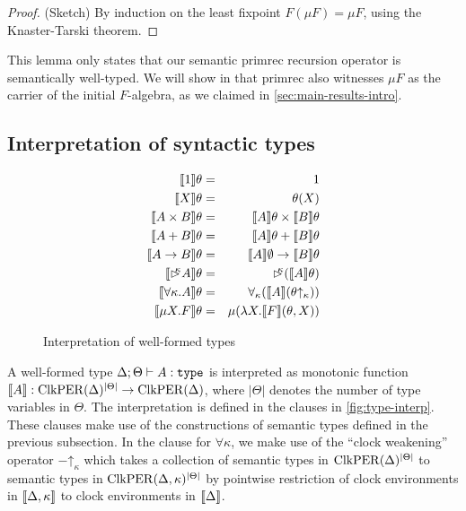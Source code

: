 \begin{proof}
  (Sketch) By induction on the least fixpoint $F(\mu F) = \mu F$,
  using the Knaster-Tarski theorem.
\end{proof}

This lemma only states that our semantic $\mathrm{primrec}$ recursion
operator is semantically well-typed. We will show in
 that $\mathrm{primrec}$ also witnesses
$\mu F$ as the carrier of the initial $F$-algebra, as we claimed in
\autoref{sec:main-results-intro}.

\subsection{Interpretation of syntactic types}\label{sec:type-interp}

\begin{figure}[t]
  \centering
  \begin{eqnarray*}
    \llbracket 1 \rrbracket\theta & = & 1 \\
    \llbracket X \rrbracket\theta & = & \theta(X) \\
    \llbracket A \times B \rrbracket\theta & = & \llbracket A \rrbracket\theta \times \llbracket B \rrbracket\theta \\
    \llbracket A + B \rrbracket\theta & = & \llbracket A \rrbracket\theta + \llbracket B \rrbracket\theta \\
    \llbracket A \to B \rrbracket\theta & = & \llbracket A \rrbracket\emptyset \to \llbracket B \rrbracket\theta \\
    \llbracket \mathord{\rhd\kern-0.4em^{\kappa}} A \rrbracket\theta & = & \mathord{\rhd\kern-0.4em^{\kappa}} (\llbracket A \rrbracket\theta) \\
    \llbracket \forall \kappa. A \rrbracket\theta & = & \forall_\kappa (\llbracket A \rrbracket(\theta\mathord\uparrow_\kappa)) \\
    \llbracket \mu X. F \rrbracket\theta & = & \mu (\lambda X. \llbracket F \rrbracket(\theta, X))
  \end{eqnarray*}
  \caption{Interpretation of well-formed types}
  \label{fig:type-interp}
\end{figure}

A well-formed type $\Delta; \Theta \vdash A : \texttt{\textup{type}}$ is
interpreted as monotonic function $\llbracket A \rrbracket :
\mathrm{ClkPER}(\Delta)^{|\Theta|} \to \mathrm{ClkPER}(\Delta)$, where $|\Theta|$
denotes the number of type variables in $\Theta$. The interpretation
is defined in the clauses in \autoref{fig:type-interp}. These clauses
make use of the constructions of semantic types defined in the
previous subsection. In the clause for $\forall \kappa$, we make use
of the ``clock weakening'' operator $-\mathord\uparrow_\kappa$ which
takes a collection of semantic types in $\mathrm{ClkPER}(\Delta)^{|\Theta|}$
to semantic types in $\mathrm{ClkPER}(\Delta,\kappa)^{|\Theta|}$ by pointwise
restriction of clock environments in $\llbracket \Delta, \kappa \rrbracket$ to clock
environments in $\llbracket \Delta \rrbracket$.

